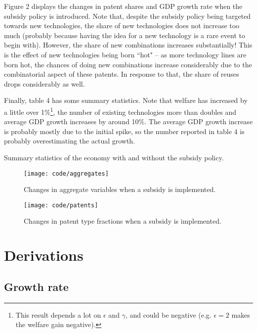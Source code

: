 \documentclass[a4paper,11pt]{article}
\begin{document}
Figure 2 displays the changes in patent shares and GDP growth rate when the subsidy policy is introduced. Note that, despite the subsidy policy being targeted towards new technologies, the share of new technologies does not increase too much (probably because having the idea for a new technology is a rare event to begin with). However, the share of new combinations increases substantially! This is the effect of new technologies being born ``hot" -- as more technology lines are born hot, the chances of doing new combinations increase considerably due to the combinatorial aspect of these patents. In response to that, the share of reuses drops considerably as well.

Finally, table 4 has some summary statistics. Note that welfare has increased by a little over 1\%\footnote{This result depends a lot on $\epsilon$ and $\gamma$, and could be negative (e.g. $\epsilon = 2$ makes the welfare gain negative).}, the number of existing technologies more than doubles and average GDP growth increases by around 10\%. The average GDP growth increase is probably mostly due to the initial spike, so the number reported in table 4 is probably overestimating the actual growth.

\begin{table}[h!]
\centering
\caption{Summary statistics of the economy with and without the subsidy policy.}

\end{table}

\begin{figure}[h!]
\centering
\caption{Changes in aggregate variables when a subsidy is implemented.}
\texttt{[image: code/aggregates]}
\end{figure}

\begin{figure}[h!]
\centering
\caption{Changes in patent type fractions when a subsidy is implemented.}
\texttt{[image: code/patents]}
\end{figure}

\clearpage

\appendix

\section{Derivations}

\subsection{Growth rate}
\end{document}
